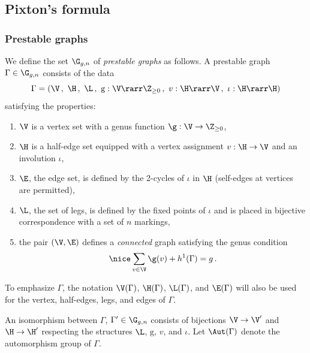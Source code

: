 \subsection{Pixton's formula}

\subsubsection{Prestable graphs}\label{xvalsg}
We define the set $\G_{g,n}$ of {\em prestable graphs} as
follows. A prestable graph $\Gamma \in \G_{g,n}$ consists of the data
$$\Gamma=(\V\, ,\ \H\, ,\ \L\, , \ \mathrm{g}:\V \rarr \Z_{\geq 0}\, ,
\ v:\H\rarr \V\, ,
\ \iota : \H\rarr \H)$$
satisfying the properties:
\begin{enumerate}
\item[(i)] $\V$ is a vertex set with a genus function $\g:\V\to \Z_{\geq 0}$,
\item[(ii)] $\H$ is a half-edge set equipped with a
vertex assignment $v:\H \to \V$ and an involution $\iota$,
\item[(iii)] $\E$, the edge set, is defined by the
2-cycles of $\iota$ in $\H$ (self-edges at vertices
are permitted),
\item[(iv)] $\L$, the set of legs, is defined by the fixed points of $\iota$ and is
placed in bijective correspondence with a set of $n$ markings,
\item[(v)] the pair $(\V,\E)$ defines a {\em connected} graph
satisfying the genus condition
$$\nice \sum_{v \in \V} \g(v) + h^1(\Gamma) = g\, .$$
\end{enumerate}
To emphasize $\Gamma$, the notation $\V(\Gamma)$, $\H(\Gamma)$, $\L(\Gamma)$, and $\E(\Gamma)$ will also be used for the vertex, half-edges, legs, and
edges of $\Gamma$.

An isomorphism between $\Gamma$, $\Gamma' \in \G_{g,n}$
consists of bijections $\V \to \V'$ and $\H \to \H'$ respecting the
structures $\L$, $\mathrm{g}$, $v$, and $\iota$.
Let $\Aut(\Gamma)$ denote the automorphism group of $\Gamma$.



